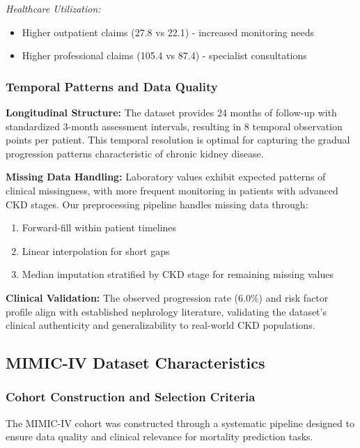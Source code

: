 \documentclass[letterpaper]{article}
\begin{document}
\textit{Healthcare Utilization:}
\begin{itemize}
    \item Higher outpatient claims (27.8 vs 22.1) - increased monitoring needs
    \item Higher professional claims (105.4 vs 87.4) - specialist consultations
\end{itemize}

\subsubsection{Temporal Patterns and Data Quality}

\textbf{Longitudinal Structure:} The dataset provides 24 months of follow-up with standardized 3-month assessment intervals, resulting in 8 temporal observation points per patient. This temporal resolution is optimal for capturing the gradual progression patterns characteristic of chronic kidney disease.

\textbf{Missing Data Handling:} Laboratory values exhibit expected patterns of clinical missingness, with more frequent monitoring in patients with advanced CKD stages. Our preprocessing pipeline handles missing data through:
\begin{enumerate}
    \item Forward-fill within patient timelines
    \item Linear interpolation for short gaps
    \item Median imputation stratified by CKD stage for remaining missing values
\end{enumerate}

\textbf{Clinical Validation:} The observed progression rate (6.0\%) and risk factor profile align with established nephrology literature, validating the dataset's clinical authenticity and generalizability to real-world CKD populations.

\subsection{MIMIC-IV Dataset Characteristics}

\subsubsection{Cohort Construction and Selection Criteria}

The MIMIC-IV cohort was constructed through a systematic pipeline designed to ensure data quality and clinical relevance for mortality prediction tasks.
\end{document}
